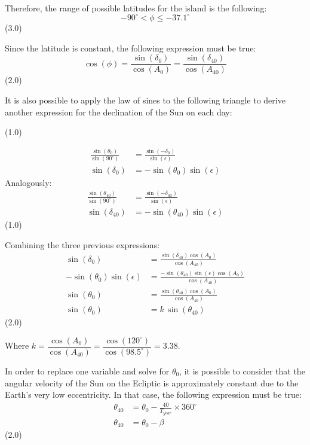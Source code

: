 \begin{description}
  Therefore, the range of possible latitudes for the island is the following:
  \[
    -90^\circ < \phi \leq -37.1^\circ
  \]
  \hfill(3.0)

\item[(b)] Since the latitude is constant, the following expression must be
  true:
  \[
    \cos(\phi) = \frac{\sin(\delta_0)}{\cos(A_0)}
               = \frac{\sin(\delta_{40})}{\cos(A_{40})}
  \]
  \hfill(2.0)

  It is also possible to apply the law of sines to the following triangle to
  derive another expression for the declination of the Sun on each day:

  \hfill(1.0)

  \begin{align*}
    \frac{\sin(\theta_0)}{\sin(90^\circ)}
      &= \frac{\sin(-\delta_0)}{\sin(\epsilon)}\\
    \sin(\delta_0) &= -\sin(\theta_0)\sin(\epsilon)
  \end{align*}
  Analogously:
  \begin{align*}
    \frac{\sin(\theta_{40})}{\sin(90^\circ)}
      &= \frac{\sin(-\delta_{40})}{\sin(\epsilon)}\\
    \sin(\delta_{40}) &= -\sin(\theta_{40})\sin(\epsilon)
  \end{align*}
  \hfill(1.0)

  Combining the three previous expressions:
  \begin{align*}
    \sin(\delta_0) &= \frac{\sin(\delta_{40})\cos(A_0)}{\cos(A_{40})}\\
    -\sin(\theta_0)\sin(\epsilon)
      &= \frac{-\sin(\theta_{40})\sin(\epsilon)\cos(A_0)}{\cos(A_{40})}\\
    \sin(\theta_0) &= \frac{\sin(\theta_{40})\cos(A_0)}{\cos(A_{40})}\\
    \sin(\theta_0) &= k\,\sin(\theta_{40})
  \end{align*}
  \hfill(2.0)

  Where
  $k = \dfrac{\cos(A_0)}{\cos(A_{40})}
     = \dfrac{\cos(120^\circ)}{\cos(98.5^\circ)} = 3.38$.

  In order to replace one variable and solve for $\theta_0$, it is possible to
  consider that the angular velocity of the Sun on the Ecliptic is
  approximately constant due to the Earth's very low eccentricity. In that
  case, the following expression must be true:
  \begin{align*}
    \theta_{40} &= \theta_0 - \frac{40}{T_{year}} \times 360^\circ\\
    \theta_{40} &= \theta_0 - \beta
  \end{align*}
  \hfill(2.0)


\end{description}
